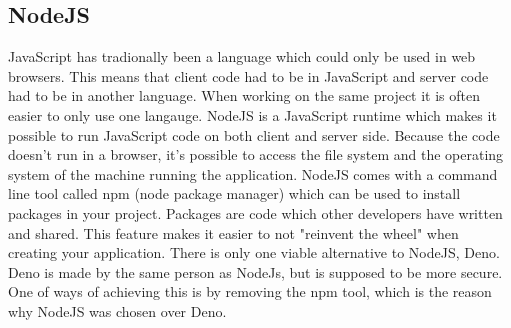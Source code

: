 \subsection{NodeJS}
JavaScript has tradionally been a language which could only be used in web browsers. This means that client code had to be in JavaScript and server code had to be in another language. When working on the same project it is often easier to only use one langauge. NodeJS is a JavaScript runtime which makes it possible to run JavaScript code on both client and server side. Because the code doesn't run in a browser, it's possible to access the file system and the operating system of the machine running the application. NodeJS comes with a command line tool called npm (node package manager) which can be used to install packages in your project. Packages are code which other developers have written and shared. This feature makes it easier to not "reinvent the wheel" when creating your application. There is only one viable alternative to NodeJS, Deno. Deno is made by the same person as NodeJs, but is supposed to be more secure. One of ways of achieving this is by removing the npm tool, which is the reason why NodeJS was chosen over Deno.